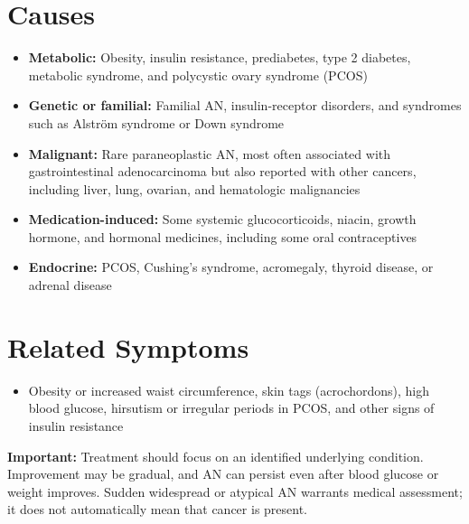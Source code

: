 \section*{Causes}
\begin{itemize}
 \item \textbf{Metabolic:} Obesity, insulin resistance, prediabetes, type 2 diabetes, metabolic syndrome, and polycystic ovary syndrome (PCOS)
 \item \textbf{Genetic or familial:} Familial AN, insulin-receptor disorders, and syndromes such as Alstr\"om syndrome or Down syndrome
 \item \textbf{Malignant:} Rare paraneoplastic AN, most often associated with gastrointestinal adenocarcinoma but also reported with other cancers, including liver, lung, ovarian, and hematologic malignancies
 \item \textbf{Medication-induced:} Some systemic glucocorticoids, niacin, growth hormone, and hormonal medicines, including some oral contraceptives
 \item \textbf{Endocrine:} PCOS, Cushing's syndrome, acromegaly, thyroid disease, or adrenal disease
\end{itemize}

\section*{Related Symptoms}
\begin{itemize}
 \item Obesity or increased waist circumference, skin tags (acrochordons), high blood glucose, hirsutism or irregular periods in PCOS, and other signs of insulin resistance
\end{itemize}
\textbf{Important:} Treatment should focus on an identified underlying condition. Improvement may be gradual, and AN can persist even after blood glucose or weight improves. Sudden widespread or atypical AN warrants medical assessment; it does not automatically mean that cancer is present.

